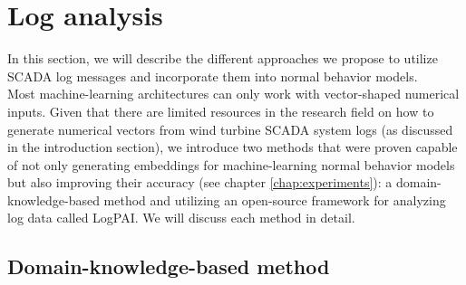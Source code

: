 \clearpage
  
\section{Log analysis}
\label{sec:LA}
In this section, we will describe the different approaches we propose to utilize SCADA log messages and incorporate them into normal behavior models.\\
Most machine-learning architectures can only work with vector-shaped numerical inputs. Given that there are limited resources in the research field on how to generate 
numerical vectors from wind turbine SCADA system logs (as discussed in the introduction section), we introduce two methods that were proven capable of not only generating embeddings for 
machine-learning normal behavior models but also improving their accuracy (see chapter \ref{chap:experiments}): a domain-knowledge-based method and 
utilizing an open-source framework for analyzing log data called LogPAI. We will discuss each method in detail.

\subsection{Domain-knowledge-based method}
\label{sub:dk_method}

